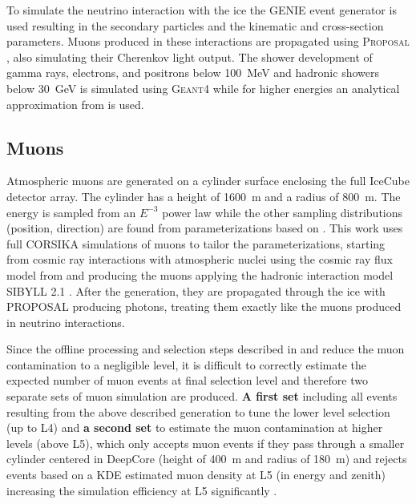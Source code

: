 To simulate the neutrino interaction with the ice the \textsc{GENIE} event generator  is used resulting in the secondary particles and the kinematic and cross-section parameters. Muons produced in these interactions are propagated using \textsc{Proposal} , also simulating their Cherenkov light output. The shower development of gamma rays, electrons, and positrons below \SI{100}{\mega\electronvolt} and hadronic showers below \SI{30}{\giga\electronvolt} is simulated using \textsc{Geant4}  while for higher energies an analytical approximation from  is used.


\subsection{Muons}

Atmospheric muons are generated on a cylinder surface enclosing the full IceCube detector array. The cylinder has a height of \SI{1600}{\meter} and a radius of \SI{800}{\meter}. The energy is sampled from an $E^{-3}$ power law while the other sampling distributions (position, direction) are found from parameterizations based on . This work uses full \textsc{CORSIKA}  simulations of muons to tailor the parameterizations, starting from cosmic ray interactions with atmospheric nuclei using the cosmic ray flux model from  and producing the muons applying the hadronic interaction model SIBYLL 2.1 . After the generation, they are propagated through the ice with \textsc{PROPOSAL} producing photons, treating them exactly like the muons produced in neutrino interactions.

Since the offline processing and selection steps described in  and  reduce the muon contamination to a negligible level, it is difficult to correctly estimate the expected number of muon events at final selection level and therefore two separate sets of muon simulation are produced. \textbf{A first set} including all events resulting from the above described generation to tune the lower level selection (up to L4) and \textbf{a second set} to estimate the muon contamination at higher levels (above L5), which only accepts muon events if they pass through a smaller cylinder centered in DeepCore (height of \SI{400}{\meter} and radius of \SI{180}{\meter}) and rejects events based on a KDE estimated muon density at L5 (in energy and zenith) increasing the simulation efficiency at L5 significantly .


